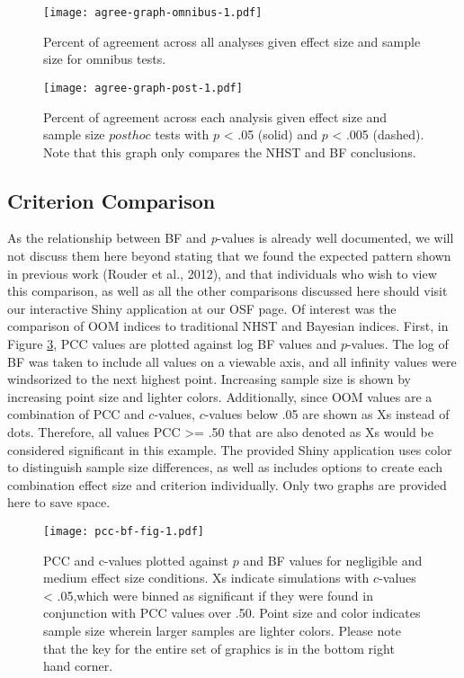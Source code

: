 \documentclass[,man, mask]{apa6}
\theoremstyle{definition}
\theoremstyle{definition}
\theoremstyle{definition}
\theoremstyle{remark}
\begin{document}
\begin{figure}
\centering
\texttt{[image: agree-graph-omnibus-1.pdf]}
\caption{\label{fig:agree-graph-omnibus}Percent of agreement across all
analyses given effect size and sample size for omnibus tests.}
\end{figure}

\begin{figure}
\centering
\texttt{[image: agree-graph-post-1.pdf]}
\caption{\label{fig:agree-graph-post}Percent of agreement across each
analysis given effect size and sample size \(post hoc\) tests with \(p\)
\textless{} .05 (solid) and \(p\) \textless{} .005 (dashed). Note that
this graph only compares the NHST and BF conclusions.}
\end{figure}

\subsection{Criterion Comparison}\label{criterion-comparison}

As the relationship between BF and \emph{p}-values is already well
documented, we will not discuss them here beyond stating that we found
the expected pattern shown in previous work (Rouder et al., 2012), and
that individuals who wish to view this comparison, as well as all the
other comparisons discussed here should visit our interactive Shiny
application at our OSF page. Of interest was the comparison of OOM
indices to traditional NHST and Bayesian indices. First, in Figure
\ref{fig:pcc-bf-fig}, PCC values are plotted against log BF values and
\(p\)-values. The log of BF was taken to include all values on a
viewable axis, and all infinity values were windsorized to the next
highest point. Increasing sample size is shown by increasing point size
and lighter colors. Additionally, since OOM values are a combination of
PCC and \(c\)-values, \(c\)-values below .05 are shown as Xs instead of
dots. Therefore, all values PCC \textgreater{}= .50 that are also
denoted as Xs would be considered significant in this example. The
provided Shiny application uses color to distinguish sample size
differences, as well as includes options to create each combination
effect size and criterion individually. Only two graphs are provided
here to save space.

\begin{figure}
\centering
\texttt{[image: pcc-bf-fig-1.pdf]}
\caption{\label{fig:pcc-bf-fig}PCC and c-values plotted against \(p\) and BF
values for negligible and medium effect size conditions. Xs indicate
simulations with \(c\)-values \textless{} .05,which were binned as
significant if they were found in conjunction with PCC values over .50.
Point size and color indicates sample size wherein larger samples are
lighter colors. Please note that the key for the entire set of graphics
is in the bottom right hand corner.}
\end{figure}
\end{document}
